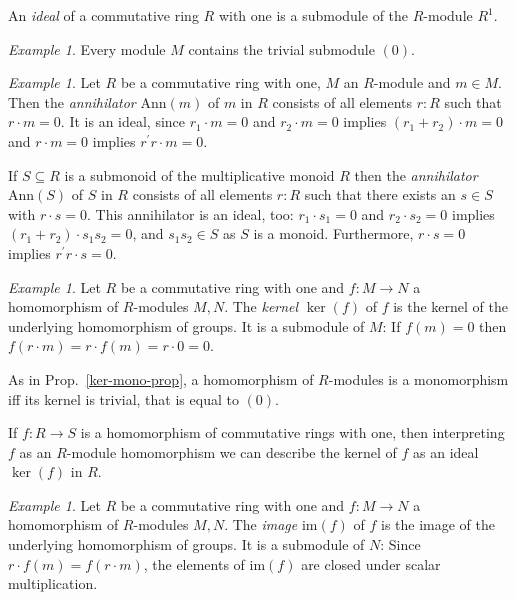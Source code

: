 \documentclass{amsart}
\theoremstyle{plain}
\numberwithin{equation}{section} %
\numberwithin{figure}{section} %
\theoremstyle{plain}
\theoremstyle{plain}
\theoremstyle{plain}
\theoremstyle{plain}
\theoremstyle{plain}
\theoremstyle{plain}
\theoremstyle{remark}
\theoremstyle{remark}
\theoremstyle{remark}
\newtheorem{exm}[thm]{Example}
\begin{document}
An \textit{ideal} of a commutative ring $R$ with one is a submodule of the $R$-module $R^1$.

\begin{exm}
Every module $M$ contains the trivial submodule $(0)$. 
\end{exm}

\begin{exm} \label{ann-exm}
Let $R$ be a commutative ring with one, $M$ an $R$-module and $m \in M$. Then the \textit{annihilator} $\mathrm{Ann}(m)$ of $m$ in $R$ consists of all elements $r : R$ such that $r \cdot m = 0$. It is an ideal, since $r_1 \cdot m = 0$ and $r_2 \cdot m = 0$ implies $(r_1 + r_2) \cdot m = 0$ and $r \cdot m = 0$ implies $r^\prime r \cdot m = 0$.

If $S \subseteq R$ is a submonoid of the multiplicative monoid $R$ then the \textit{annihilator} $\mathrm{Ann}(S)$ of $S$ in $R$ consists of all elements $r : R$ such that there exists an $s \in S$ with $r \cdot s = 0$. This annihilator is an ideal, too: $r_1 \cdot s_1 = 0$ and $r_2 \cdot s_2 = 0$ implies $(r_1 + r_2) \cdot s_1s_2 = 0$, and $s_1s_2 \in S$ as $S$ is a monoid. Furthermore, $r \cdot s = 0$ implies $r^\prime r \cdot s = 0$.
\end{exm}

\begin{exm}
Let $R$ be a commutative ring with one and $f : M \rightarrow N$ a homomorphism of $R$-modules $M, N$. The \textit{kernel} $\ker(f)$ of $f$ is the kernel of the underlying homomorphism of groups. It is a submodule of $M$: If $f(m) = 0$ then $f(r \cdot m) = r \cdot f(m) = r \cdot 0 = 0$.

As in Prop.~\ref{ker-mono-prop}, a homomorphism of $R$-modules is a monomorphism iff its kernel is trivial, that is equal to $(0)$.

If $f: R \rightarrow S$ is a homomorphism of commutative rings with one, then interpreting $f$ as an $R$-module homomorphism we can describe the kernel of $f$ as an ideal $\ker(f)$ in $R$.
\end{exm}

\begin{exm}
Let $R$ be a commutative ring with one and $f : M \rightarrow N$ a homomorphism of $R$-modules $M, N$. The \textit{image} $\mathrm{im}(f)$ of $f$ is the image of the underlying homomorphism of groups. It is a submodule of $N$: Since $r \cdot f(m) = f(r \cdot m)$, the elements of $\mathrm{im}(f)$ are closed under scalar multiplication.
\end{exm}
\end{document}
